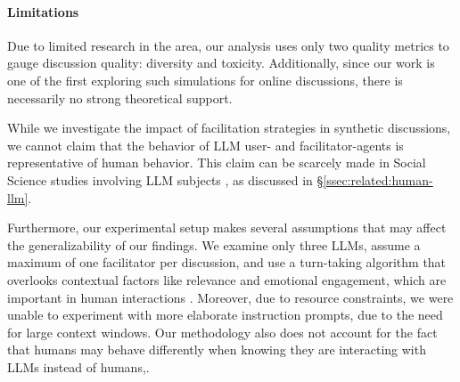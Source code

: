 %
\paragraph{Limitations} 
Due to limited research in the area, our analysis uses only two quality metrics to gauge discussion quality: diversity and toxicity. Additionally, since our work is one of the first  exploring such simulations for online discussions, there is necessarily no strong theoretical support.  

While we investigate the impact of facilitation strategies in synthetic discussions, we cannot claim that the behavior of LLM user- and facilitator-agents is representative of human behavior. This claim can be scarcely made in Social Science studies involving LLM subjects \cite{rossi_2024, zhou-etal-2024-real}, as discussed in \S\ref{ssec:related:human-llm}.

Furthermore, our experimental setup makes several assumptions that may affect the generalizability of our findings. We examine only three LLMs, assume a maximum of one facilitator per discussion, and use a turn-taking algorithm that overlooks contextual factors like relevance and emotional engagement, which are important in human interactions \cite{robert_2016_comment, Ziegele03102018}. Moreover, due to resource constraints, we were unable to experiment with more elaborate instruction prompts, due to the need for large context windows. Our methodology also does not account for the fact that humans may behave differently when knowing they are interacting with LLMs instead of humans,.

